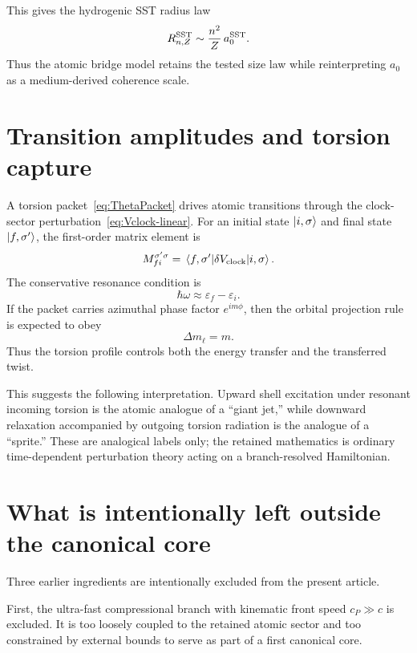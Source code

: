\documentclass[11pt,a4paper]{article}
\begin{document}
This gives the hydrogenic SST radius law
\begin{equation}
\label{eq:RnZ}
R_{n,Z}^{\rm SST}\sim \frac{n^2}{Z}\,a_0^{\rm SST}.
\end{equation}
Thus the atomic bridge model retains the tested size law while reinterpreting $a_0$ as a medium-derived coherence scale.

\section{Transition amplitudes and torsion capture}
A torsion packet~\eqref{eq:ThetaPacket} drives atomic transitions through the clock-sector perturbation~\eqref{eq:Vclock-linear}. For an initial state $\ket{i,\sigma}$ and final state $\ket{f,\sigma'}$, the first-order matrix element is
\begin{equation}
\label{eq:Mfi}
M_{fi}^{\sigma'\sigma}=\matrixel{f,\sigma'}{\delta V_{\rm clock}}{i,\sigma}.
\end{equation}
The conservative resonance condition is
\begin{equation}
\label{eq:resonance}
\hbar\omega \approx \varepsilon_f-\varepsilon_i.
\end{equation}
If the packet carries azimuthal phase factor $e^{im\phi}$, then the orbital projection rule is expected to obey
\begin{equation}
\label{eq:dm}
\Delta m_\ell = m.
\end{equation}
Thus the torsion profile controls both the energy transfer and the transferred twist.

This suggests the following interpretation. Upward shell excitation under resonant incoming torsion is the atomic analogue of a ``giant jet,'' while downward relaxation accompanied by outgoing torsion radiation is the analogue of a ``sprite.'' These are analogical labels only; the retained mathematics is ordinary time-dependent perturbation theory acting on a branch-resolved Hamiltonian.

\section{What is intentionally left outside the canonical core}
Three earlier ingredients are intentionally excluded from the present article.

First, the ultra-fast compressional branch with kinematic front speed $c_P\gg c$ is excluded. It is too loosely coupled to the retained atomic sector and too constrained by external bounds to serve as part of a first canonical core.
\end{document}

